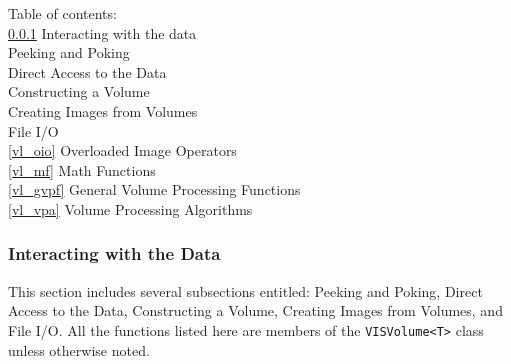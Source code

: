 Table of contents:\\
\hspace*{0.25in}\ref{vl_iwtd} Interacting with the data\\
\hspace*{0.5in}Peeking and Poking\\
\hspace*{0.5in}Direct Access to the Data\\
\hspace*{0.5in}Constructing a Volume\\
\hspace*{0.5in}Creating Images from Volumes\\
\hspace*{0.5in}File I/O\\
\hspace*{0.25in}\ref{vl_oio} Overloaded Image Operators\\
\hspace*{0.25in}\ref{vl_mf} Math Functions\\
\hspace*{0.25in}\ref{vl_gvpf} General Volume Processing Functions\\
\hspace*{0.25in}\ref{vl_vpa} Volume Processing Algorithms\\

\subsubsection{Interacting with the Data}
\label{vl_iwtd}
This section includes several subsections entitled:
Peeking and Poking, Direct Access to the Data, Constructing a Volume,
Creating Images from Volumes, and File I/O.
All the functions listed here are members of the
{\tt VISVolume<T>} class unless otherwise noted.

